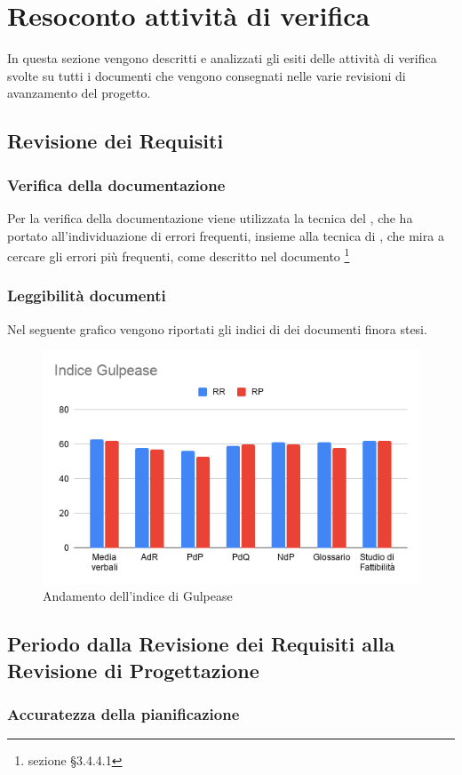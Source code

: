 \section{Resoconto attività di verifica}
In questa sezione vengono descritti e analizzati gli esiti delle attività di verifica svolte su tutti i documenti che vengono consegnati nelle varie revisioni di avanzamento del progetto.
	\subsection{Revisione dei Requisiti}
		\subsubsection{Verifica della documentazione}
		Per la verifica della documentazione viene utilizzata la tecnica del , che ha portato all'individuazione di errori frequenti, insieme alla tecnica di , che mira a cercare gli errori più frequenti, come descritto nel documento \footnote{sezione §3.4.4.1}
		\subsubsection{Leggibilità documenti}
		Nel seguente grafico vengono riportati gli indici di  dei documenti finora stesi.
		\begin{figure}[H]
			\centering
			\includegraphics[width=0.7\linewidth]{res/images/IndiceGulpease.png}
			\caption{Andamento dell'indice di Gulpease}
			\label{fig:Figura7}
		\end{figure}
	\subsection{Periodo dalla Revisione dei Requisiti alla Revisione di Progettazione}
		\subsubsection{Accuratezza della pianificazione}
